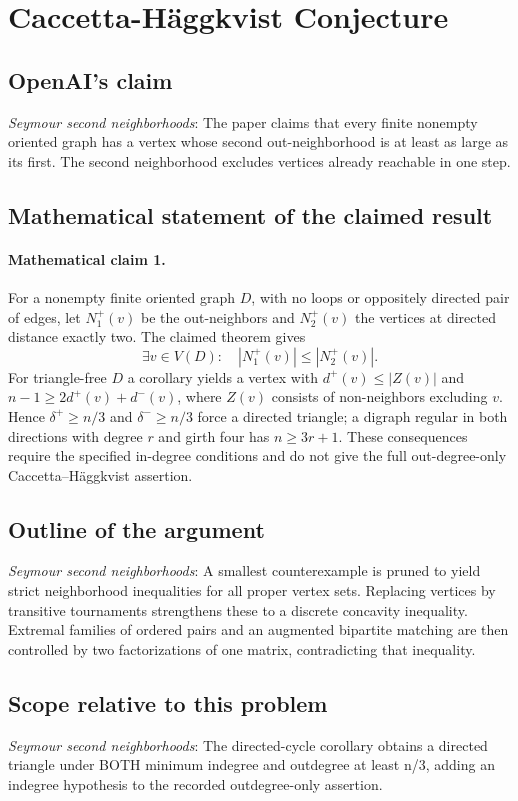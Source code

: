 \documentclass[11pt]{article}
\begin{document}
\section*{Caccetta-Häggkvist Conjecture}

\subsection{OpenAI's claim}
\textit{Seymour second neighborhoods}: The paper claims that every finite nonempty oriented graph has a vertex whose second out-neighborhood is at least as large as its first. The second neighborhood excludes vertices already reachable in one step.

\subsection{Mathematical statement of the claimed result}
\paragraph{Mathematical claim 1.} For a nonempty finite oriented graph $D$, with no loops or oppositely directed pair of edges, let $N_1^+(v)$ be the out-neighbors and $N_2^+(v)$ the vertices at directed distance exactly two. The claimed theorem gives \[\exists v\in V(D):\quad|N_1^+(v)|\le|N_2^+(v)|.\] For triangle-free $D$ a corollary yields a vertex with $d^+(v)\le|Z(v)|$ and $n-1\ge2d^+(v)+d^-(v)$, where $Z(v)$ consists of non-neighbors excluding $v$. Hence $\delta^+\ge n/3$ and $\delta^-\ge n/3$ force a directed triangle; a digraph regular in both directions with degree $r$ and girth four has $n\ge3r+1$. These consequences require the specified in-degree conditions and do not give the full out-degree-only Caccetta--H\"aggkvist assertion.

\subsection{Outline of the argument}
\textit{Seymour second neighborhoods}: A smallest counterexample is pruned to yield strict neighborhood inequalities for all proper vertex sets. Replacing vertices by transitive tournaments strengthens these to a discrete concavity inequality. Extremal families of ordered pairs and an augmented bipartite matching are then controlled by two factorizations of one matrix, contradicting that inequality.

\subsection{Scope relative to this problem}
\textit{Seymour second neighborhoods}: The directed-cycle corollary obtains a directed triangle under BOTH minimum indegree and outdegree at least n/3, adding an indegree hypothesis to the recorded outdegree-only assertion.
\end{document}
